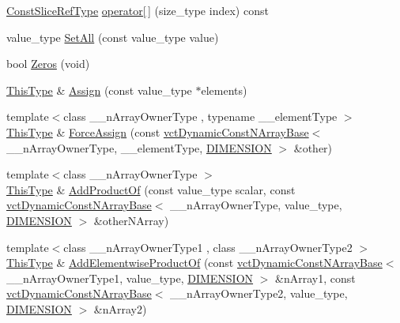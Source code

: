 \begin{DoxyCompactItemize}
\hyperlink{classvct_dynamic_const_n_array_base_ad4a09eb0789ba4c5b8d799fbe0ee3d79}{Const\-Slice\-Ref\-Type} \hyperlink{classvct_dynamic_n_array_base_a57164e18fbbcd86894b3e6df8950f0c7}{operator\mbox{[}$\,$\mbox{]}} (size\-\_\-type index) const 
\item 
value\-\_\-type \hyperlink{classvct_dynamic_n_array_base_a4f0285807b627852ebd8ab0ac3ef3fec}{Set\-All} (const value\-\_\-type value)
\item 
bool \hyperlink{classvct_dynamic_n_array_base_ac1cddb3277bd7ff287b3029ce7d3f96a}{Zeros} (void)
\item 
\hyperlink{classvct_dynamic_const_n_array_base_a5123caffcf1455a1b99003877eade897}{This\-Type} \& \hyperlink{classvct_dynamic_n_array_base_a4c61f0aa5815a95536dd6b28e9cde4cc}{Assign} (const value\-\_\-type $\ast$elements)
\item 
{\footnotesize template$<$class \-\_\-\-\_\-n\-Array\-Owner\-Type , typename \-\_\-\-\_\-element\-Type $>$ }\\\hyperlink{classvct_dynamic_const_n_array_base_a5123caffcf1455a1b99003877eade897}{This\-Type} \& \hyperlink{classvct_dynamic_n_array_base_a1ed6220b294edbd63633ca6f2134e87b}{Force\-Assign} (const \hyperlink{classvct_dynamic_const_n_array_base}{vct\-Dynamic\-Const\-N\-Array\-Base}$<$ \-\_\-\-\_\-n\-Array\-Owner\-Type, \-\_\-\-\_\-element\-Type, \hyperlink{classvct_dynamic_n_array_base_aa66532d28588bdf26d08fb593db815d6abfcde386ec801b212d7c42d63a4f3837}{D\-I\-M\-E\-N\-S\-I\-O\-N} $>$ \&other)
\item 
{\footnotesize template$<$class \-\_\-\-\_\-n\-Array\-Owner\-Type $>$ }\\\hyperlink{classvct_dynamic_const_n_array_base_a5123caffcf1455a1b99003877eade897}{This\-Type} \& \hyperlink{classvct_dynamic_n_array_base_a77dcddd52be300f4bd8859c5409496d0}{Add\-Product\-Of} (const value\-\_\-type scalar, const \hyperlink{classvct_dynamic_const_n_array_base}{vct\-Dynamic\-Const\-N\-Array\-Base}$<$ \-\_\-\-\_\-n\-Array\-Owner\-Type, value\-\_\-type, \hyperlink{classvct_dynamic_n_array_base_aa66532d28588bdf26d08fb593db815d6abfcde386ec801b212d7c42d63a4f3837}{D\-I\-M\-E\-N\-S\-I\-O\-N} $>$ \&other\-N\-Array)
\item 
{\footnotesize template$<$class \-\_\-\-\_\-n\-Array\-Owner\-Type1 , class \-\_\-\-\_\-n\-Array\-Owner\-Type2 $>$ }\\\hyperlink{classvct_dynamic_const_n_array_base_a5123caffcf1455a1b99003877eade897}{This\-Type} \& \hyperlink{classvct_dynamic_n_array_base_aabfddcad178acd2d6d3097e39391e6e0}{Add\-Elementwise\-Product\-Of} (const \hyperlink{classvct_dynamic_const_n_array_base}{vct\-Dynamic\-Const\-N\-Array\-Base}$<$ \-\_\-\-\_\-n\-Array\-Owner\-Type1, value\-\_\-type, \hyperlink{classvct_dynamic_n_array_base_aa66532d28588bdf26d08fb593db815d6abfcde386ec801b212d7c42d63a4f3837}{D\-I\-M\-E\-N\-S\-I\-O\-N} $>$ \&n\-Array1, const \hyperlink{classvct_dynamic_const_n_array_base}{vct\-Dynamic\-Const\-N\-Array\-Base}$<$ \-\_\-\-\_\-n\-Array\-Owner\-Type2, value\-\_\-type, \hyperlink{classvct_dynamic_n_array_base_aa66532d28588bdf26d08fb593db815d6abfcde386ec801b212d7c42d63a4f3837}{D\-I\-M\-E\-N\-S\-I\-O\-N} $>$ \&n\-Array2)
\end{DoxyCompactItemize}
